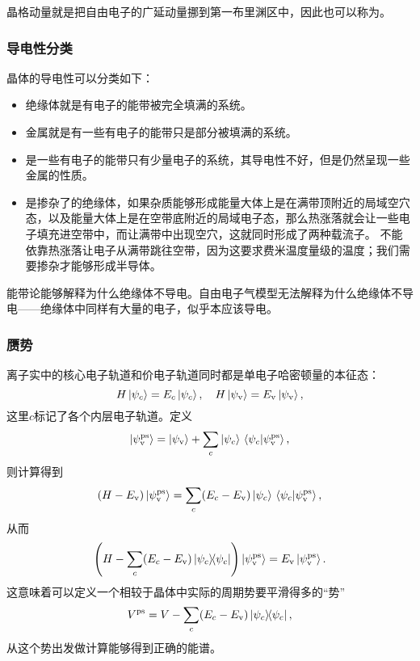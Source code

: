 晶格动量就是把自由电子的广延动量挪到第一布里渊区中，因此也可以称为。

\subsubsection{导电性分类}

晶体的导电性可以分类如下：
\begin{itemize}
    \item 绝缘体就是有电子的能带被完全填满的系统。
    \item 金属就是有一些有电子的能带只是部分被填满的系统。
    \item {}是一些有电子的能带只有少量电子的系统，其导电性不好，但是仍然呈现一些金属的性质。
    \item {}是掺杂了的绝缘体，如果杂质能够形成能量大体上是在满带顶附近的局域空穴态，以及能量大体上是在空带底附近的局域电子态，那么热涨落就会让一些电子填充进空带中，而让满带中出现空穴，这就同时形成了两种载流子。
    不能依靠热涨落让电子从满带跳往空带，因为这要求费米温度量级的温度；我们需要掺杂才能够形成半导体。
\end{itemize}

能带论能够解释为什么绝缘体不导电。自由电子气模型无法解释为什么绝缘体不导电——绝缘体中同样有大量的电子，似乎本应该导电。

\subsubsection{赝势}

离子实中的核心电子轨道和价电子轨道同时都是单电子哈密顿量的本征态：
\begin{equation}
    H \ket{\psi_c} = E_c \ket{\psi_c}, \quad H \ket{\psi_\text{v}} = E_\text{v} \ket{\psi_\text{v}},
\end{equation}
这里$c$标记了各个内层电子轨道。定义
\begin{equation}
    \ket{\psi_\text{v}^\text{ps}} = \ket{\psi_\text{v}} + \sum_c \ket{\psi_c} \braket*{\psi_c}{\psi_\text{v}^\text{ps}},
\end{equation}
则计算得到
\[
    (H - E_\text{v}) \ket{\psi_\text{v}^\text{ps}} = \sum_c (E_c - E_\text{v}) \ket{\psi_c} \braket*{\psi_c}{\psi_\text{v}^\text{ps}},
\]
从而
\begin{equation}
    \left(H - \sum_c (E_c - E_\text{v}) \dyad*{\psi_c}\right) \ket{\psi_\text{v}^\text{ps}} = E_\text{v} \ket{\psi_\text{v}^\text{ps}}.
\end{equation}
这意味着可以定义一个相较于晶体中实际的周期势要平滑得多的“势”
\begin{equation}
    V^\text{ps} = V - \sum_c (E_c - E_\text{v}) \dyad*{\psi_c},
\end{equation}
从这个势出发做计算能够得到正确的能谱。

